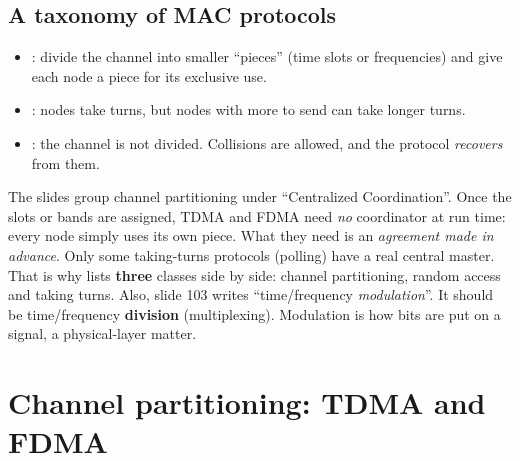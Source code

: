 \subsection{A taxonomy of MAC protocols}

\begin{center}
\end{center}

\begin{itemize}
  \item {}: divide the channel into smaller ``pieces'' (time slots or frequencies) and give each node a piece for its exclusive use.
  \item {}: nodes take turns, but nodes with more to send can take longer turns.
  \item {}: the channel is not divided. Collisions are allowed, and the protocol \emph{recovers} from them.
\end{itemize}

\begin{pitfall}
The slides group channel partitioning under ``Centralized Coordination''. Once the slots or bands are assigned, TDMA and FDMA need \emph{no} coordinator at run time:
every node simply uses its own piece. What they need is an \emph{agreement made in advance}. Only some taking-turns protocols (polling) have a real central master.
That is why  lists \textbf{three} classes side by side: channel partitioning, random access and taking turns. Also, slide 103 writes ``time/frequency
\emph{modulation}''. It should be time/frequency \textbf{division} (multiplexing). Modulation is how bits are put on a signal, a physical-layer matter.
\end{pitfall}

\section{Channel partitioning: TDMA and FDMA}

